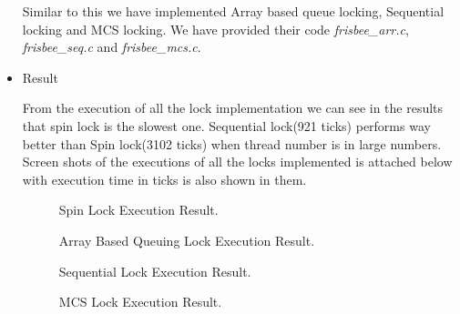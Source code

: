 \documentclass[a4paper, 11pt]{article}
\begin{document}
\begin{itemize}
\begin{lstlisting}
\end{lstlisting}

Similar to this we have implemented Array based queue locking, Sequential locking and MCS locking. We have provided their code 
\emph{frisbee\_arr.c}, \emph{frisbee\_seq.c} and \emph{frisbee\_mcs.c}.
\newpage
\item Result

From the execution of all the lock implementation we can see in the results that spin lock  is the slowest one. Sequential lock(921 ticks) performs way better than Spin lock(3102 ticks) when thread number is in large numbers. Screen shots of the executions of all the locks implemented is attached below with execution time in ticks is also shown in them. 

\begin{figure}[h]
	\centering
	\caption{Spin Lock Execution Result.}
\end{figure}

\begin{figure}
	\centering
	\caption{Array Based Queuing Lock Execution Result.}
\end{figure}

\begin{figure}
	\centering
	\caption{Sequential Lock Execution Result.}
\end{figure}

\begin{figure}
	\centering
	\caption{MCS Lock Execution Result.}
\end{figure}

\end{itemize}
\end{document}
